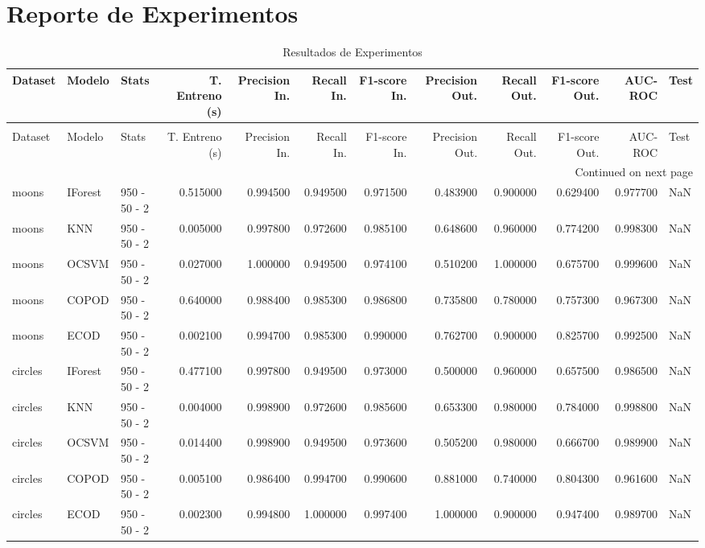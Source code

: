 \documentclass{article}
\begin{document}
\section*{Reporte de Experimentos}
\begin{longtable}{lllrrrrrrrrl}
\caption{Resultados de Experimentos} \label{tab:resultados} \\
\toprule
Dataset & Modelo & Stats & T. Entreno (s) & Precision In. & Recall In. & F1-score In. & Precision Out. & Recall Out. & F1-score Out. & AUC-ROC & Test \\
\midrule
\endfirsthead
\caption[]{Resultados de Experimentos} \\
\toprule
Dataset & Modelo & Stats & T. Entreno (s) & Precision In. & Recall In. & F1-score In. & Precision Out. & Recall Out. & F1-score Out. & AUC-ROC & Test \\
\midrule
\endhead
\midrule
\multicolumn{12}{r}{Continued on next page} \\
\midrule
\endfoot
\bottomrule
\endlastfoot
moons & IForest & 950 - 50 - 2 & 0.515000 & 0.994500 & 0.949500 & 0.971500 & 0.483900 & 0.900000 & 0.629400 & 0.977700 & NaN \\
moons & KNN & 950 - 50 - 2 & 0.005000 & 0.997800 & 0.972600 & 0.985100 & 0.648600 & 0.960000 & 0.774200 & 0.998300 & NaN \\
moons & OCSVM & 950 - 50 - 2 & 0.027000 & 1.000000 & 0.949500 & 0.974100 & 0.510200 & 1.000000 & 0.675700 & 0.999600 & NaN \\
moons & COPOD & 950 - 50 - 2 & 0.640000 & 0.988400 & 0.985300 & 0.986800 & 0.735800 & 0.780000 & 0.757300 & 0.967300 & NaN \\
moons & ECOD & 950 - 50 - 2 & 0.002100 & 0.994700 & 0.985300 & 0.990000 & 0.762700 & 0.900000 & 0.825700 & 0.992500 & NaN \\
circles & IForest & 950 - 50 - 2 & 0.477100 & 0.997800 & 0.949500 & 0.973000 & 0.500000 & 0.960000 & 0.657500 & 0.986500 & NaN \\
circles & KNN & 950 - 50 - 2 & 0.004000 & 0.998900 & 0.972600 & 0.985600 & 0.653300 & 0.980000 & 0.784000 & 0.998800 & NaN \\
circles & OCSVM & 950 - 50 - 2 & 0.014400 & 0.998900 & 0.949500 & 0.973600 & 0.505200 & 0.980000 & 0.666700 & 0.989900 & NaN \\
circles & COPOD & 950 - 50 - 2 & 0.005100 & 0.986400 & 0.994700 & 0.990600 & 0.881000 & 0.740000 & 0.804300 & 0.961600 & NaN \\
circles & ECOD & 950 - 50 - 2 & 0.002300 & 0.994800 & 1.000000 & 0.997400 & 1.000000 & 0.900000 & 0.947400 & 0.989700 & NaN \\

\end{longtable}
\end{document}
